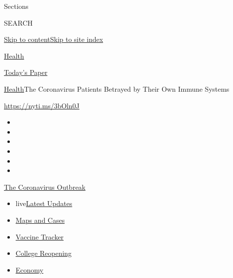Sections

SEARCH

\protect\hyperlink{site-content}{Skip to
content}\protect\hyperlink{site-index}{Skip to site index}

\href{https://www.nytimes3xbfgragh.onion/section/health}{Health}

\href{https://myaccount.nytimes3xbfgragh.onion/auth/login?response_type=cookie\&client_id=vi}{}

\href{https://www.nytimes3xbfgragh.onion/section/todayspaper}{Today's
Paper}

\href{/section/health}{Health}\textbar{}The Coronavirus Patients
Betrayed by Their Own Immune Systems

\url{https://nyti.ms/3bOln0J}

\begin{itemize}
\item
\item
\item
\item
\item
\item
\end{itemize}

\href{https://www.nytimes3xbfgragh.onion/news-event/coronavirus?action=click\&pgtype=Article\&state=default\&region=TOP_BANNER\&context=storylines_menu}{The
Coronavirus Outbreak}

\begin{itemize}
\tightlist
\item
  live\href{https://www.nytimes3xbfgragh.onion/2020/08/04/world/coronavirus-cases.html?action=click\&pgtype=Article\&state=default\&region=TOP_BANNER\&context=storylines_menu}{Latest
  Updates}
\item
  \href{https://www.nytimes3xbfgragh.onion/interactive/2020/us/coronavirus-us-cases.html?action=click\&pgtype=Article\&state=default\&region=TOP_BANNER\&context=storylines_menu}{Maps
  and Cases}
\item
  \href{https://www.nytimes3xbfgragh.onion/interactive/2020/science/coronavirus-vaccine-tracker.html?action=click\&pgtype=Article\&state=default\&region=TOP_BANNER\&context=storylines_menu}{Vaccine
  Tracker}
\item
  \href{https://www.nytimes3xbfgragh.onion/2020/08/02/us/covid-college-reopening.html?action=click\&pgtype=Article\&state=default\&region=TOP_BANNER\&context=storylines_menu}{College
  Reopening}
\item
  \href{https://www.nytimes3xbfgragh.onion/live/2020/08/04/business/stock-market-today-coronavirus?action=click\&pgtype=Article\&state=default\&region=TOP_BANNER\&context=storylines_menu}{Economy}
\end{itemize}

